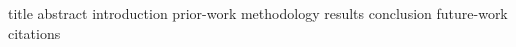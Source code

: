 \documentclass {journal}
\begin{document}
\def \JoDPagesTotal {30000}
\def \JoDPagesGoldStandard {15000}
\def \JoDCitationsTotal {xyz}

 {title}
 {abstract}
 {introduction}
 {prior-work}
 {methodology}
 {results}
 {conclusion}
 {future-work}
 {citations}
\end{document}
